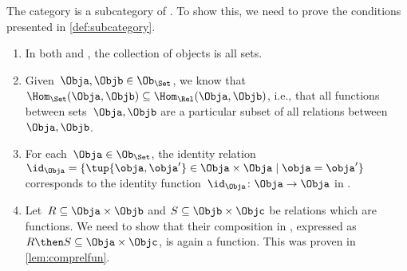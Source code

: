 \begin{example}
  The category \Set is a subcategory of \Rel. To show this, we need to prove the conditions presented in \cref{def:subcategory}.
  \begin{enumerate}
    \item In both \Rel and \Set, the collection of objects is all sets.
    \item Given~$\Obja,\Objb\in \Ob_{\Set}$, we know that~$\Hom_{\Set}(\Obja,\Objb)\subseteq \Hom_{\Rel}(\Obja,\Objb)$, i.e., that all functions between sets~$\Obja,\Objb$ are a particular subset of all relations between~$\Obja,\Objb$.
    \item For each~$\Obja \in \Ob_{\Set}$, the identity relation~$\id_\Obja=\{\tup{\obja,\obja'}\in \Obja\times \Obja \mid \obja=\obja'\}$ corresponds to the identity function~$\id_\Obja \colon \Obja \to \Obja$ in \Set.
    \item Let~$R\subseteq \Obja\times \Objb$ and $S\subseteq \Objb \times \Objc$ be relations which are functions. We need to show that their composition in \Rel, expressed as~$R\then S\subseteq \Obja\times \Objc$, is again a function. This was proven in \cref{lem:comprelfun}.
  \end{enumerate}

\end{example}

